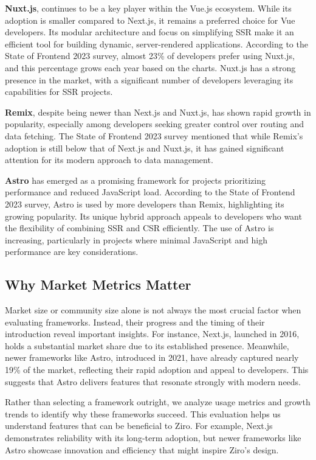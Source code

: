 \textbf{Nuxt.js}, continues to be a key player within the Vue.js ecosystem. While its adoption is smaller compared to Next.js, it remains a preferred choice for Vue developers. Its modular architecture and focus on simplifying SSR make it an efficient tool for building dynamic, server-rendered applications. According to the State of Frontend 2023 survey, almost 23\% of developers prefer using Nuxt.js, and this percentage grows each year based on the charts. Nuxt.js has a strong presence in the market, with a significant number of developers leveraging its capabilities for SSR projects.

\textbf{Remix}, despite being newer than Next.js and Nuxt.js, has shown rapid growth in popularity, especially among developers seeking greater control over routing and data fetching. The State of Frontend 2023 survey mentioned that while Remix’s adoption is still below that of Next.js and Nuxt.js, it has gained significant attention for its modern approach to data management.

\textbf{Astro} has emerged as a promising framework for projects prioritizing performance and reduced JavaScript load. According to the State of Frontend 2023 survey, Astro is used by more developers than Remix, highlighting its growing popularity. Its unique hybrid approach appeals to developers who want the flexibility of combining SSR and CSR efficiently. The use of Astro is increasing, particularly in projects where minimal JavaScript and high performance are key considerations.

\subsection{Why Market Metrics Matter}

Market size or community size alone is not always the most crucial factor when evaluating frameworks. Instead, their progress and the timing of their introduction reveal important insights. For instance, Next.js, launched in 2016, holds a substantial market share due to its established presence. Meanwhile, newer frameworks like Astro, introduced in 2021, have already captured nearly 19\% of the market, reflecting their rapid adoption and appeal to developers. This suggests that Astro delivers features that resonate strongly with modern needs.

Rather than selecting a framework outright, we analyze usage metrics and growth trends to identify why these frameworks succeed. This evaluation helps us understand features that can be beneficial to Ziro. For example, Next.js demonstrates reliability with its long-term adoption, but newer frameworks like Astro showcase innovation and efficiency that might inspire Ziro’s design.

